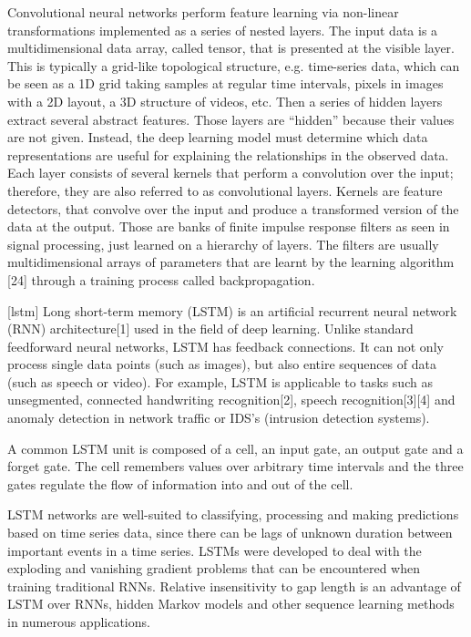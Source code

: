 \documentclass{turabian-thesis}
\begin{document}
Convolutional neural networks perform feature learning via non-linear transformations implemented as a series of nested layers. The input data is a multidimensional data array, called tensor, that is presented at the visible layer. This is typically a grid-like topological structure, e.g. time-series data, which can be seen as a 1D grid taking samples at regular time intervals, pixels in images with a 2D layout, a 3D structure of videos, etc. Then a series of hidden layers extract several abstract features. Those layers are “hidden” because their values are not given. Instead, the deep learning model must determine which data representations are useful for explaining the relationships in the observed data. Each layer consists of several kernels that perform a convolution over the input; therefore, they are also referred to as convolutional layers. Kernels are feature detectors, that convolve over the input and produce a transformed version of the data at the output. Those are banks of finite impulse response filters as seen in signal processing, just learned on a hierarchy of layers. The filters are usually multidimensional arrays of parameters that are learnt by the learning algorithm [24] through a training process called backpropagation.

[lstm]
Long short-term memory (LSTM) is an artificial recurrent neural network (RNN) architecture[1] used in the field of deep learning. Unlike standard feedforward neural networks, LSTM has feedback connections. It can not only process single data points (such as images), but also entire sequences of data (such as speech or video). For example, LSTM is applicable to tasks such as unsegmented, connected handwriting recognition[2], speech recognition[3][4] and anomaly detection in network traffic or IDS's (intrusion detection systems).

A common LSTM unit is composed of a cell, an input gate, an output gate and a forget gate. The cell remembers values over arbitrary time intervals and the three gates regulate the flow of information into and out of the cell.


LSTM networks are well-suited to classifying, processing and making predictions based on time series data, since there can be lags of unknown duration between important events in a time series. LSTMs were developed to deal with the exploding and vanishing gradient problems that can be encountered when training traditional RNNs. Relative insensitivity to gap length is an advantage of LSTM over RNNs, hidden Markov models and other sequence learning methods in numerous applications.
\end{document}
